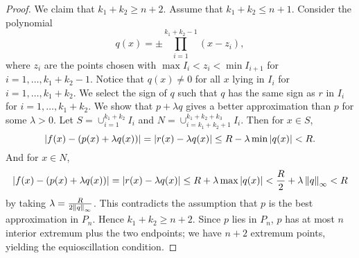 \begin{proof}
    We claim that $k_1 + k_2 \geq n+2$. Assume that $k_1 + k_2 \leq n+1$. 
    Consider the polynomial 
    \begin{equation*}
        q(x) = \pm\prod_{i=1}^{k_1 + k_2 - 1} (x - z_i),
    \end{equation*}
    where $z_i$ are the points chosen with $\max I_i < z_i < \min I_{i+1}$ 
    for $i = 1,\ldots,k_1+k_2-1$. Notice that $q(x)\neq 0$ for all $x$ 
    lying in $I_i$ for $i = 1,\ldots,k_1+k_2$. We select the sign of $q$ 
    such that $q$ has the same sign as $r$ in $I_i$ for $i = 1,\ldots,k_1+k_2$. 
    We show that $p + \lambda q$ gives a better approximation than $p$ for 
    some $\lambda > 0$. Let $S = \cup_{i=1}^{k_1+k_2}I_i$ and 
    $N = \cup_{i=k_1+k_2+1}^{k_1+k_2+k_3}I_i$. Then for $x\in S$, 
    \begin{equation*}
        \left\lvert {f(x) - (p(x) + \lambda q(x))} \right\rvert = \left\lvert {r(x) - \lambda q(x)} \right\rvert \leq R - \lambda \min\left\lvert {q(x)} \right\rvert < R.
    \end{equation*}
    And for $x\in N$, 
    \begin{equation*}
        \left\lvert {f(x) - (p(x) + \lambda q(x))} \right\rvert = \left\lvert {r(x) - \lambda q(x)} \right\rvert \leq R + \lambda \max\left\lvert {q(x)} \right\rvert 
        < \frac{R}{2} + \lambda \left\lVert {q} \right\rVert_\infty < R
    \end{equation*}
    by taking $\lambda = \frac{R}{2\left\lVert {q} \right\rVert_\infty}$. This contradicts the 
    assumption that $p$ is the best approximation in $P_n$. Hence $k_1 + k_2 \geq n+2$. 
    Since $p$ lies in $P_n$, $p$ has at most $n$ interior extremum plus 
    the two endpoints; we have $n+2$ extremum points, yielding the equioscillation 
    condition.
\end{proof}
